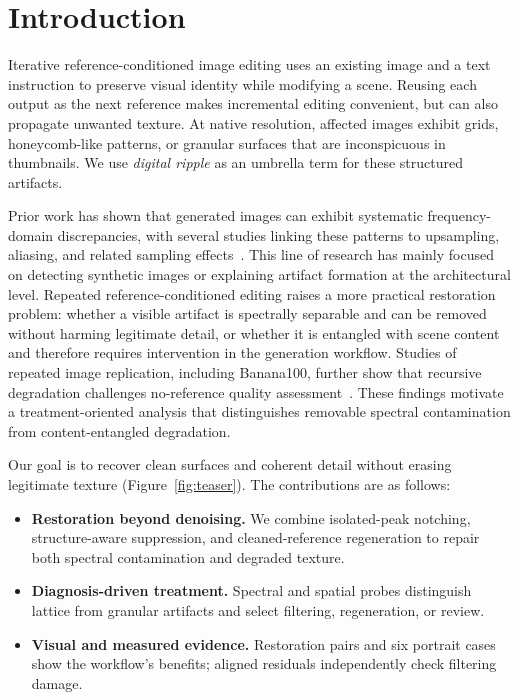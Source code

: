 \documentclass[sigplan,10pt,nonacm]{acmart}
\begin{document}
\section{Introduction}
Iterative reference-conditioned image editing uses an existing image and a text instruction to preserve visual identity while modifying a scene. 
Reusing each output as the next reference makes incremental editing convenient, but can also propagate unwanted texture. 
At native resolution, affected images exhibit grids, honeycomb-like patterns, or granular surfaces that are inconspicuous in thumbnails. 
We use \emph{digital ripple} as an umbrella term for these structured artifacts.

Prior work has shown that generated images can exhibit systematic frequency-domain discrepancies, with several studies linking these patterns to upsampling, aliasing, and related sampling effects~\cite{durall,dzanic,frank,odena,karras}. This line of research has mainly focused on detecting synthetic images or explaining artifact formation at the architectural level. Repeated reference-conditioned editing raises a more practical restoration problem: whether a visible artifact is spectrally separable and can be removed without harming legitimate detail, or whether it is entangled with scene content and therefore requires intervention in the generation workflow. Studies of repeated image replication, including Banana100, further show that recursive degradation challenges no-reference quality assessment~\cite{banana100}. These findings motivate a treatment-oriented analysis that distinguishes removable spectral contamination from content-entangled degradation.

Our goal is to recover clean surfaces and coherent detail without erasing legitimate texture (Figure~\ref{fig:teaser}).
The contributions are as follows:

\begin{itemize}
  \item \textbf{Restoration beyond denoising.} We combine isolated-peak notching, structure-aware suppression, and cleaned-reference regeneration to repair both spectral contamination and degraded texture.
  \item \textbf{Diagnosis-driven treatment.} Spectral and spatial probes distinguish lattice from granular artifacts and select filtering, regeneration, or review.
  \item \textbf{Visual and measured evidence.} Restoration pairs and six portrait cases show the workflow's benefits; aligned residuals independently check filtering damage.
\end{itemize}
\end{document}
